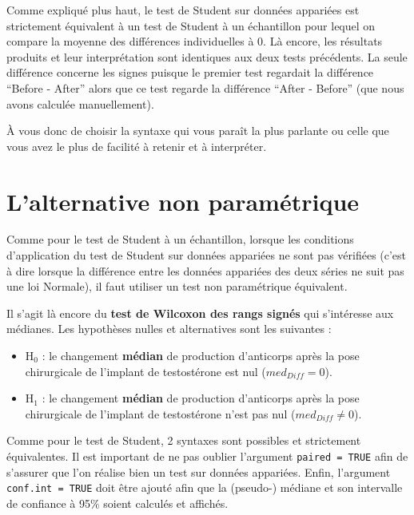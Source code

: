\documentclass[
  french,
  a4paper,
  DIV=11,
  numbers=noendperiod,
  oneside]{scrreprt}
\newenvironment{Shaded}{}{}
\newcommand{\AttributeTok}[1]{\textcolor[rgb]{0.84,0.23,0.29}{#1}}
\newcommand{\ConstantTok}[1]{\textcolor[rgb]{0.00,0.36,0.77}{#1}}
\newcommand{\FunctionTok}[1]{\textcolor[rgb]{0.44,0.26,0.76}{#1}}
\newcommand{\NormalTok}[1]{\textcolor[rgb]{0.14,0.16,0.18}{#1}}
\newcommand{\SpecialCharTok}[1]{\textcolor[rgb]{0.00,0.36,0.77}{#1}}
\providecommand{\tightlist}{%
  \setlength{\itemsep}{0pt}\setlength{\parskip}{0pt}}
\begin{document}
Comme expliqué plus haut, le test de Student sur données appariées est
strictement équivalent à un test de Student à un échantillon pour lequel
on compare la moyenne des différences individuelles à 0. Là encore, les
résultats produits et leur interprétation sont identiques aux deux tests
précédents. La seule différence concerne les signes puisque le premier
test regardait la différence ``Before - After'' alors que ce test
regarde la différence ``After - Before'' (que nous avons calculée
manuellement).

À vous donc de choisir la syntaxe qui vous paraît la plus parlante ou
celle que vous avez le plus de facilité à retenir et à interpréter.

\section{L'alternative non
paramétrique}\label{lalternative-non-paramuxe9trique-1}

Comme pour le test de Student à un échantillon, lorsque les conditions
d'application du test de Student sur données appariées ne sont pas
vérifiées (c'est à dire lorsque la différence entre les données
appariées des deux séries ne suit pas une loi Normale), il faut utiliser
un test non paramétrique équivalent.

Il s'agit là encore du \textbf{test de Wilcoxon des rangs signés} qui
s'intéresse aux médianes. Les hypothèses nulles et alternatives sont les
suivantes :

\begin{itemize}
\tightlist
\item
  H\(_0\) : le changement \textbf{médian} de production d'anticorps
  après la pose chirurgicale de l'implant de testostérone est nul
  (\(med_{Diff} = 0\)).
\item
  H\(_1\) : le changement \textbf{médian} de production d'anticorps
  après la pose chirurgicale de l'implant de testostérone n'est pas nul
  (\(med_{Diff} \neq 0\)).
\end{itemize}

Comme pour le test de Student, 2 syntaxes sont possibles et strictement
équivalentes. Il est important de ne pas oublier l'argument
\texttt{paired\ =\ TRUE} afin de s'assurer que l'on réalise bien un test
sur données appariées. Enfin, l'argument \texttt{conf.int\ =\ TRUE} doit
être ajouté afin que la (pseudo-) médiane et son intervalle de confiance
à 95\% soient calculés et affichés.

\begin{Shaded}
\end{Shaded}
\end{document}
